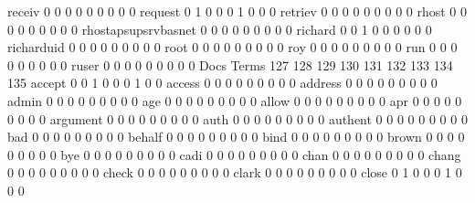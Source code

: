 \documentclass[compress,8pt]{beamer}
\begin{document}
\begin{frame}
\begin{Schunk}
  receiv                                     0   0   0   0   0   0   0   0   0
  request                                    0   1   0   0   0   1   0   0   0
  retriev                                    0   0   0   0   0   0   0   0   0
  rhost                                      0   0   0   0   0   0   0   0   0
  rhostapsupsrvbasnet                        0   0   0   0   0   0   0   0   0
  richard                                    0   0   1   0   0   0   0   0   0
  richarduid                                 0   0   0   0   0   0   0   0   0
  root                                       0   0   0   0   0   0   0   0   0
  roy                                        0   0   0   0   0   0   0   0   0
  run                                        0   0   0   0   0   0   0   0   0
  ruser                                      0   0   0   0   0   0   0   0   0
                                          Docs
Terms                                      127 128 129 130 131 132 133 134 135
  accept                                     0   0   1   0   0   0   1   0   0
  access                                     0   0   0   0   0   0   0   0   0
  address                                    0   0   0   0   0   0   0   0   0
  admin                                      0   0   0   0   0   0   0   0   0
  age                                        0   0   0   0   0   0   0   0   0
  allow                                      0   0   0   0   0   0   0   0   0
  apr                                        0   0   0   0   0   0   0   0   0
  argument                                   0   0   0   0   0   0   0   0   0
  auth                                       0   0   0   0   0   0   0   0   0
  authent                                    0   0   0   0   0   0   0   0   0
  bad                                        0   0   0   0   0   0   0   0   0
  behalf                                     0   0   0   0   0   0   0   0   0
  bind                                       0   0   0   0   0   0   0   0   0
  brown                                      0   0   0   0   0   0   0   0   0
  bye                                        0   0   0   0   0   0   0   0   0
  cadi                                       0   0   0   0   0   0   0   0   0
  chan                                       0   0   0   0   0   0   0   0   0
  chang                                      0   0   0   0   0   0   0   0   0
  check                                      0   0   0   0   0   0   0   0   0
  clark                                      0   0   0   0   0   0   0   0   0
  close                                      0   1   0   0   0   1   0   0   0

\end{Schunk}
\end{frame}
\end{document}
